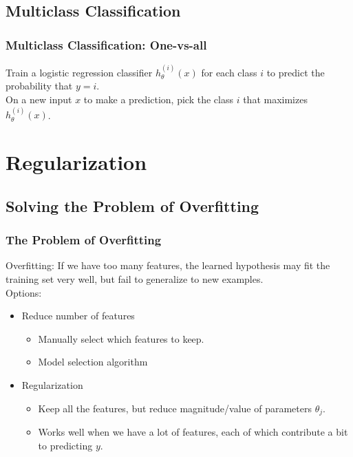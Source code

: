 \documentclass{article}
\begin{document}
\subsection{Multiclass Classification}
\subsubsection{Multiclass Classification: One-vs-all}
Train a logistic regression classifier $h_\theta^{(i)}(x)$ for each class $i$ to predict the probability that $y = i$.\\

On a new input $x$ to make a prediction, pick the class $i$ that maximizes $h_\theta^{(i)}(x)$.

\newpage

\section{Regularization}
\subsection{Solving the Problem of Overfitting}
\subsubsection{The Problem of Overfitting}
Overfitting: If we have too many features, the learned hypothesis may fit the training set very well, but fail to generalize to new examples. \\

Options:
\begin{itemize}
  \item Reduce number of features
  \begin{itemize}
    \item Manually select which features to keep.
    \item Model selection algorithm
  \end{itemize}
  
  \item Regularization
  \begin{itemize}
    \item Keep all the features, but reduce magnitude/value of parameters $\theta_j$.
    \item Works well when we have a lot of features, each of which contribute a bit to predicting $y$.
  \end{itemize}
\end{itemize}
\end{document}
